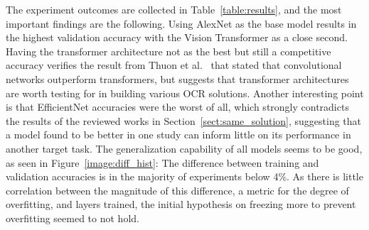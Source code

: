 \documentclass[english,twoside,openright]{UH_DS_MSc}
\begin{document}
The experiment outcomes are collected in Table~\ref{table:results}, and 
the most important findings are the following. Using AlexNet as the base model results in the highest 
validation accuracy with the Vision Transformer as a close second. Having the transformer 
architecture not as the best but still a competitive accuracy verifies the result 
from Thuon et al.~\cite{9thuonPalm} that stated that convolutional networks outperform transformers, but suggests 
that transformer architectures are worth testing for in building various OCR
solutions. Another interesting point is that EfficientNet accuracies were the worst of all, 
which strongly contradicts the results of the reviewed works in Section~\ref{sect:same_solution},
suggesting that a model found to be better in one study can inform little on its performance in another target task.
The generalization capability of all models seems to be good, as seen in Figure~\ref{image:diff_hist}:
The difference between training and validation accuracies is in the majority of 
experiments below 4\%. As there is little correlation between the magnitude of this difference, 
a metric for the degree of overfitting, and layers trained, the initial hypothesis on freezing more to prevent overfitting
seemed to not hold.
\end{document}
